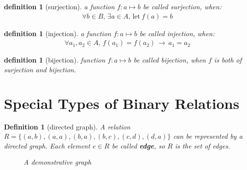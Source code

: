 \newtheorem{injection}[theorem_root]{definition}
\newtheorem{surjection}[theorem_root]{definition}
\newtheorem{bijection}[theorem_root]{definition}
\begin{surjection}[surjection]
a function $f: a\mapsto b$ be called surjection, when:
\begin{align*}
\forall b\in B,\,\exists a\in A,\,\text{let}\ f(a) = b
\end{align*}
\end{surjection}
\begin{injection}[injection]
a function $f: a\mapsto b$ be called injection, when:
\begin{align*}
\forall a_1, a_2\in A,\, f(a_1) = f(a_2) \,\longrightarrow\, a_1 = a_2
\end{align*}
\end{injection}
\begin{bijection}[bijection]
function $f: a\mapsto b$ be called bijection, when $f$ is both of surjection and bijection.
\end{bijection}

\section{Special Types of Binary Relations}

\newtheorem{directedgraph}[theorem_root]{Definition}
\begin{directedgraph}[directed graph]
    A relation $R = \{(a, b), (a, a), (b, a), (b, c), (c, d), (d,a)\}$ can be represented by a directed graph.
    Each element $e\in R$ be called {\bf edge}, so $R$ is the set of edges.
    \begin{figure}[H]
    \begin{center}
    \caption{A demonstrative graph}
    \label{fig:demo-graph}
    \end{center}
    \end{figure}
\end{directedgraph}

